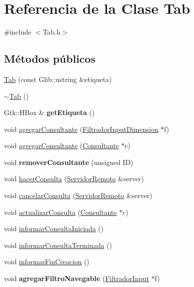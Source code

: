 \hypertarget{classTab}{\section{\-Referencia de la \-Clase \-Tab}
\label{classTab}
}


{\ttfamily \#include $<$\-Tab.\-h$>$}

\subsection*{\-Métodos públicos}
\begin{DoxyCompactItemize}
\item 
\hyperlink{classTab_adf46383cb8b4278681e32a40ef89c545}{\-Tab} (const \-Glib\-::ustring \&etiqueta)
\item 
\hyperlink{classTab_a8cc210bcede02daa21145bb1675c3c80}{$\sim$\-Tab} ()
\item 
\hypertarget{classTab_a5a4e5e895f7a0a313d469aad02947abb}{\-Gtk\-::\-H\-Box \& {\bfseries get\-Etiqueta} ()}\label{classTab_a5a4e5e895f7a0a313d469aad02947abb}

\item 
void \hyperlink{classTab_ab8ffebb5665e2203b505730539e7263e}{agregar\-Consultante} (\hyperlink{classFiltradorInputDimension}{\-Filtrador\-Input\-Dimension} $\ast$f)
\item 
void \hyperlink{classTab_a6869b3f6cc2f3e7ab89d0de93e9eb40e}{agregar\-Consultante} (\hyperlink{classConsultante}{\-Consultante} $\ast$c)
\item 
\hypertarget{classTab_ad63c85c78ad3f5b6b5dc1c6941e1f5b2}{void {\bfseries remover\-Consultante} (unsigned \-I\-D)}\label{classTab_ad63c85c78ad3f5b6b5dc1c6941e1f5b2}

\item 
void \hyperlink{classTab_a2702dc2c1dc1d0ec163f26483880199a}{hacer\-Consulta} (\hyperlink{classServidorRemoto}{\-Servidor\-Remoto} \&server)
\item 
void \hyperlink{classTab_a04f0afa07a274bcfee2ddbbb58a7f0dd}{cancelar\-Consulta} (\hyperlink{classServidorRemoto}{\-Servidor\-Remoto} \&server)
\item 
void \hyperlink{classTab_a956337a5e9f33fccaf1f0f275f7920b9}{actualizar\-Consulta} (\hyperlink{classConsultante}{\-Consultante} $\ast$c)
\item 
void \hyperlink{classTab_a2aead15ff3730f8ec5fb0aa2cf8124bb}{informar\-Consulta\-Iniciada} ()
\item 
void \hyperlink{classTab_a3a6a052ecc01597c2d6040a5065d7dd8}{informar\-Consulta\-Terminada} ()
\item 
void \hyperlink{classTab_a0bca519aadf5728818037564c584b30a}{informar\-Fin\-Creacion} ()
\item 
\hypertarget{classTab_a5890898a9b09a57abeb9e97928b51f9a}{void {\bfseries agregar\-Filtro\-Navegable} (\hyperlink{classFiltradorInput}{\-Filtrador\-Input} $\ast$f)}\label{classTab_a5890898a9b09a57abeb9e97928b51f9a}


\end{DoxyCompactItemize}
